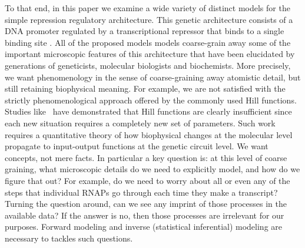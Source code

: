 To that end, in this paper we examine a wide variety of distinct models for the
simple repression regulatory architecture. This genetic architecture consists of
a DNA promoter regulated by a transcriptional repressor that binds to a single
binding site \cite{Garcia2011a}. All of the proposed models models coarse-grain
away some of the important microscopic features of this architecture that have
been elucidated by generations of geneticists, molecular biologists and
biochemists.
More precisely, we want phenomenology in the sense of coarse-graining away
atomistic detail, but still retaining biophysical meaning. For example, we are
not satisfied with the strictly phenomenological approach offered by the
commonly used Hill functions. Studies like~\cite{Razo-Mejia2018} have
demonstrated that Hill functions are clearly insufficient since each new
situation requires a completely new set of parameters. Such work requires a
quantitative theory of how biophysical changes at the molecular level propagate
to input-output functions at the genetic circuit level. We want concepts, not
mere facts. In particular a key question is: at this level of coarse graining,
what microscopic details do we need to explicitly model, and how do we figure
that out? For example, do we need to worry about all or even any of the steps
that individual RNAPs go through each time they make a transcript? Turning the
question around, can we see any imprint of those processes in the available
data? If the answer is no, then those processes are irrelevant for our purposes.
Forward modeling and inverse (statistical inferential) modeling are necessary to 
tackles such questions.

